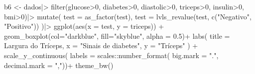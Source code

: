 \documentclass[
  letterpaper,
  DIV=11,
  numbers=noendperiod]{scrartcl}
\newenvironment{Shaded}{\begin{snugshade}}{\end{snugshade}}
\newcommand{\AttributeTok}[1]{\textcolor[rgb]{0.40,0.45,0.13}{#1}}
\newcommand{\DecValTok}[1]{\textcolor[rgb]{0.68,0.00,0.00}{#1}}
\newcommand{\FloatTok}[1]{\textcolor[rgb]{0.68,0.00,0.00}{#1}}
\newcommand{\FunctionTok}[1]{\textcolor[rgb]{0.28,0.35,0.67}{#1}}
\newcommand{\NormalTok}[1]{\textcolor[rgb]{0.00,0.23,0.31}{#1}}
\newcommand{\OtherTok}[1]{\textcolor[rgb]{0.00,0.23,0.31}{#1}}
\newcommand{\SpecialCharTok}[1]{\textcolor[rgb]{0.37,0.37,0.37}{#1}}
\newcommand{\StringTok}[1]{\textcolor[rgb]{0.13,0.47,0.30}{#1}}
\begin{document}
\begin{Shaded}
\begin{Highlighting}[]
\NormalTok{b6 }\OtherTok{\textless{}{-}}\NormalTok{ dados}\SpecialCharTok{|\textgreater{}}
  \FunctionTok{filter}\NormalTok{(glucose}\SpecialCharTok{\textgreater{}}\DecValTok{0}\NormalTok{, diabetes}\SpecialCharTok{\textgreater{}}\DecValTok{0}\NormalTok{, diastolic}\SpecialCharTok{\textgreater{}}\DecValTok{0}\NormalTok{,}
\NormalTok{         triceps}\SpecialCharTok{\textgreater{}}\DecValTok{0}\NormalTok{, insulin}\SpecialCharTok{\textgreater{}}\DecValTok{0}\NormalTok{, bmi}\SpecialCharTok{\textgreater{}}\DecValTok{0}\NormalTok{)}\SpecialCharTok{|\textgreater{}}
  \FunctionTok{mutate}\NormalTok{(}
    \AttributeTok{test =} \FunctionTok{as\_factor}\NormalTok{(test),}
    \AttributeTok{test =} \FunctionTok{lvls\_revalue}\NormalTok{(test, }\FunctionTok{c}\NormalTok{(}\StringTok{"Negativo"}\NormalTok{, }\StringTok{"Positivo"}\NormalTok{))}
\NormalTok{  )}\SpecialCharTok{|\textgreater{}}
  \FunctionTok{ggplot}\NormalTok{(}\FunctionTok{aes}\NormalTok{(}\AttributeTok{x =}\NormalTok{ test, }\AttributeTok{y =}\NormalTok{ triceps)) }\SpecialCharTok{+}
  \FunctionTok{geom\_boxplot}\NormalTok{(}\AttributeTok{col=}\StringTok{"darkblue"}\NormalTok{, }\AttributeTok{fill=}\StringTok{"skyblue"}\NormalTok{, }\AttributeTok{alpha =} \FloatTok{0.5}\NormalTok{)}\SpecialCharTok{+}
  \FunctionTok{labs}\NormalTok{(}
    \AttributeTok{title =} \StringTok{\textquotesingle{}Largura do Tríceps\textquotesingle{}}\NormalTok{,}
    \AttributeTok{x =} \StringTok{"Sinais de diabetes"}\NormalTok{,}
    \AttributeTok{y =} \StringTok{"Tríceps"}
\NormalTok{  ) }\SpecialCharTok{+}
  \FunctionTok{scale\_y\_continuous}\NormalTok{(}
    \AttributeTok{labels =}\NormalTok{ scales}\SpecialCharTok{::}\FunctionTok{number\_format}\NormalTok{(}
      \AttributeTok{big.mark =} \StringTok{"."}\NormalTok{,}
      \AttributeTok{decimal.mark =} \StringTok{","}\NormalTok{))}\SpecialCharTok{+}
  \FunctionTok{theme\_bw}\NormalTok{()}


\end{Highlighting}
\end{Shaded}
\end{document}
